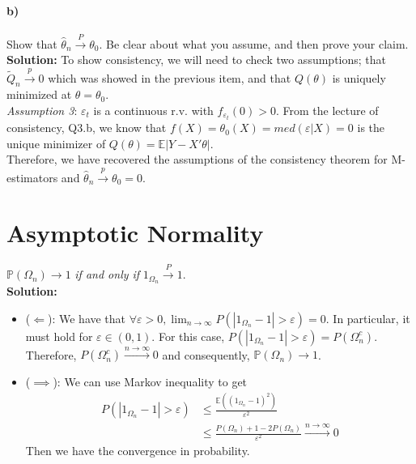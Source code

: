 \documentclass[11pt,letterpaper]{article}                  %
\begin{document}
\begin{problem}
\paragraph{b)} Show that $\widehat{\theta}_n\overset{P}{\rightarrow}\theta_0$. Be clear about what you assume, and then prove your claim.\\

\textbf{Solution:} To show consistency, we will need to check two assumptions; that $\tilde{Q}_n \overset{p}{\rightarrow}0$ which was showed in the previous item, and that $Q(\theta)$ is uniquely minimized at $\theta=\theta_0$.\\
\textit{Assumption 3}: $\varepsilon_t$ is a continuous r.v. with $f_{\varepsilon_t}(0)>0$. From the lecture of consistency, Q3.b, we know that $f(X)=\theta_0(X)=med(\varepsilon|X)=0$ is the unique minimizer of $Q(\theta)=\mathbb{E}|Y-X'\theta|$.\\
Therefore, we have recovered the assumptions of the consistency theorem for M-estimators and $\hat{\theta}_n\overset{p}{\rightarrow}{\theta_0}=0$.
\end{problem}

\bigskip
\begin{problem}
\end{problem}

\section{Asymptotic Normality}

\begin{problem}
$\mathbb{P}(\Omega_n)\rightarrow 1$ \textit{if and only if} $1_{\Omega_n} \overset{P}{\rightarrow}1$.\\

\textbf{Solution:}
\begin{itemize}
\item{($\Longleftarrow$)}: We have that $\forall \varepsilon>0, \lim_{n\to\infty} P(|1_{\Omega_n}-1|>\varepsilon)=0$. In particular, it must hold for $\varepsilon \in (0,1)$. For this case, $P(|1_{\Omega_n}-1|>\varepsilon)=P(\Omega_n^c)$. Therefore, $P(\Omega_n^c) \overset{n \to\infty}{\longrightarrow} 0$ and consequently, $\mathbb{P}(\Omega_n)\rightarrow 1$.

\item{($\implies$)}: We can use Markov inequality to get
\begin{align*}
P(|1_{\Omega_n}-1|>\varepsilon)&\leq \frac{\mathbb{E}((1_{\Omega_n}-1)^2)}{\varepsilon^2}\\
&\leq \frac{P(\Omega_n)+1-2P(\Omega_n)}{\varepsilon^2} \overset{n\to\infty}{\longrightarrow}0
\end{align*}
Then we have the convergence in probability.
\end{itemize}
\end{problem}
\end{document}
